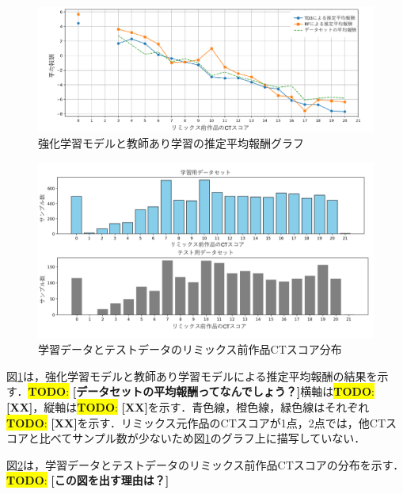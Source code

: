 \documentclass[submit,techrep,noauthor]{ipsj}
\newcommand{\todo}[1]{\colorbox{yellow}{{\bf TODO}:}{\color{red} {\textbf{[#1]}}}}
\begin{document}
\begin{figure}[h]
  \centering
  \includegraphics[width=\linewidth]{@IPSJ_SIGSE202511_Horio/fig/estgraph.pdf}
  \caption{強化学習モデルと教師あり学習の推定平均報酬グラフ}
  \label{estgraph}
\end{figure}
\begin{figure}[h]
  \centering
  \includegraphics[width=\linewidth]{@IPSJ_SIGSE202511_Horio/fig/train_testdata.pdf}
  \caption{学習データとテストデータのリミックス前作品CTスコア分布}
  \label{train_testdata}
\end{figure}

図\ref{estgraph}は，強化学習モデルと教師あり学習モデルによる推定平均報酬の結果を示す．\todo{データセットの平均報酬ってなんでしょう？}横軸は\todo{XX}，縦軸は\todo{XX}を示す．青色線，橙色線，緑色線はそれぞれ\todo{XX}を示す．リミックス元作品のCTスコアが1点，2点では，他CTスコアと比べてサンプル数が少ないため図\ref{estgraph}のグラフ上に描写していない．

図\ref{train_testdata}は，学習データとテストデータのリミックス前作品CTスコアの分布を示す．\todo{この図を出す理由は？}




\end{document}
